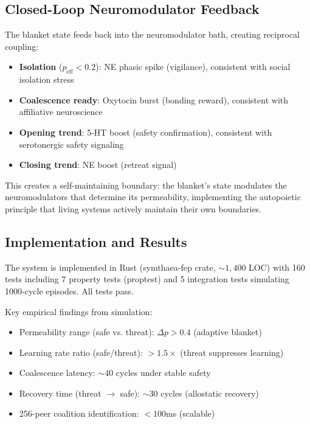 \subsection{Closed-Loop Neuromodulator Feedback}

The blanket state feeds back into the neuromodulator bath, creating reciprocal
coupling:

\begin{itemize}
    \item \textbf{Isolation} ($p_{\text{eff}} < 0.2$): NE phasic spike
          (vigilance), consistent with social isolation stress \citep{cacioppo2009social}
    \item \textbf{Coalescence ready}: Oxytocin burst (bonding reward),
          consistent with affiliative neuroscience \citep{feldman2012oxytocin}
    \item \textbf{Opening trend}: 5-HT boost (safety confirmation),
          consistent with serotonergic safety signaling \citep{lowry2005modulation}
    \item \textbf{Closing trend}: NE boost (retreat signal)
\end{itemize}

This creates a self-maintaining boundary: the blanket's state modulates the
neuromodulators that determine its permeability, implementing the autopoietic
principle that living systems actively maintain their own boundaries.

\subsection{Implementation and Results}

The system is implemented in Rust (symthaea-fep crate, ${\sim}1{,}400$ LOC)
with 160 tests including 7 property tests (proptest) and 5 integration tests
simulating 1000-cycle episodes. All tests pass.

Key empirical findings from simulation:
\begin{itemize}
    \item Permeability range (safe vs. threat): $\Delta p > 0.4$ (adaptive blanket)
    \item Learning rate ratio (safe/threat): $> 1.5\times$ (threat suppresses learning)
    \item Coalescence latency: ${\sim}40$ cycles under stable safety
    \item Recovery time (threat $\to$ safe): ${\sim}30$ cycles (allostatic recovery)
    \item 256-peer coalition identification: $< 100$ms (scalable)
\end{itemize}

